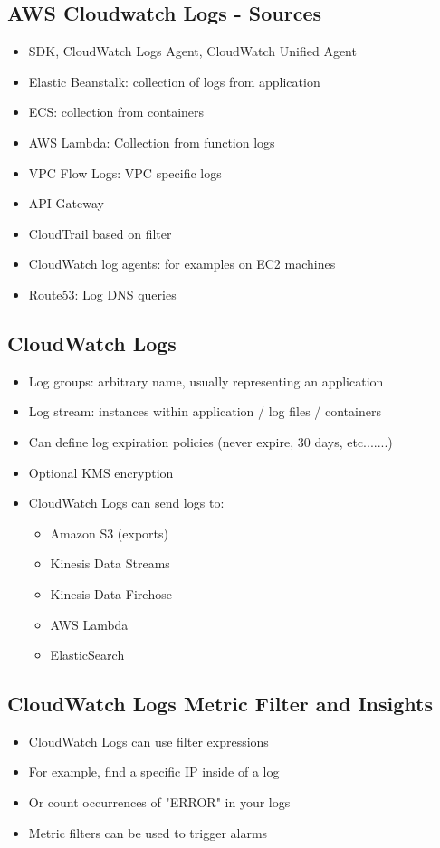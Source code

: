 \subsection{AWS Cloudwatch Logs - Sources}
\begin{itemize}
    \item SDK, CloudWatch Logs Agent, CloudWatch Unified Agent
    \item Elastic Beanstalk: collection of logs from application
    \item ECS: collection from containers
    \item AWS Lambda: Collection from function logs
    \item VPC Flow Logs: VPC specific logs
    \item API Gateway
    \item CloudTrail based on filter
    \item CloudWatch log agents: for examples on EC2 machines
    \item Route53: Log DNS queries
\end{itemize}

\subsection{CloudWatch Logs}
\begin{itemize}
    \item Log groups: arbitrary name, usually representing an application
    \item Log stream: instances within application / log files / containers
    \item Can define log expiration policies (never expire, 30 days, etc.......)
    \item Optional KMS encryption
    \item CloudWatch Logs can send logs to:
    \begin{itemize}
        \item Amazon S3 (exports)
        \item Kinesis Data Streams
        \item Kinesis Data Firehose
        \item AWS Lambda
        \item ElasticSearch
    \end{itemize}
\end{itemize}

\subsection{CloudWatch Logs Metric Filter and Insights}
\begin{itemize}
    \item CloudWatch Logs can use filter expressions
    \item For example, find a specific IP inside of a log
    \item Or count occurrences of "ERROR" in your logs
    \item Metric filters can be used to trigger alarms
\end{itemize}

